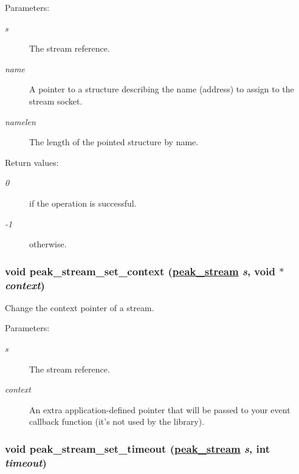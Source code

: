 \begin{Desc}
\item[Parameters:]
\begin{description}
\item[{\em s}]The stream reference. \item[{\em name}]A pointer to a structure describing the name (address) to assign to the stream socket. \item[{\em namelen}]The length of the pointed structure by name.\end{description}
\end{Desc}
\begin{Desc}
\item[Return values:]
\begin{description}
\item[{\em 0}]if the operation is successful. \item[{\em -1}]otherwise. \end{description}
\end{Desc}
\hypertarget{group__stream__common_ga10}{
\subsubsection[peak\_\-stream\_\-set\_\-context]{\setlength{\rightskip}{0pt plus 5cm}void peak\_\-stream\_\-set\_\-context (\hyperlink{group__stream_ga0}{peak\_\-stream} {\em s}, void $\ast$ {\em context})}}
\label{group__stream__common_ga10}


Change the context pointer of a stream. 

\begin{Desc}
\item[Parameters:]
\begin{description}
\item[{\em s}]The stream reference. \item[{\em context}]An extra application-defined pointer that will be passed to your event callback function (it's not used by the library). \end{description}
\end{Desc}
\hypertarget{group__stream__common_ga13}{
\subsubsection[peak\_\-stream\_\-set\_\-timeout]{\setlength{\rightskip}{0pt plus 5cm}void peak\_\-stream\_\-set\_\-timeout (\hyperlink{group__stream_ga0}{peak\_\-stream} {\em s}, int {\em timeout})}}
\label{group__stream__common_ga13}


